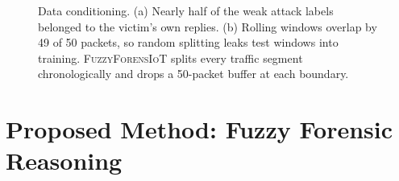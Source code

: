 \documentclass[conference]{IEEEtran}
\newcommand{\fname}{\textsc{FuzzyForensIoT}}
\begin{document}
\begin{figure}[t]
{}
\caption{Data conditioning. (a) Nearly half of the weak attack labels belonged to the victim's own replies. (b) Rolling windows overlap by 49 of 50 packets, so random splitting leaks test windows into training. \fname{} splits every traffic segment chronologically and drops a 50-packet buffer at each boundary.}
\label{fig:conditioning}
\end{figure}

\section{Proposed Method: Fuzzy Forensic Reasoning}
\label{sec:method}
\end{document}
